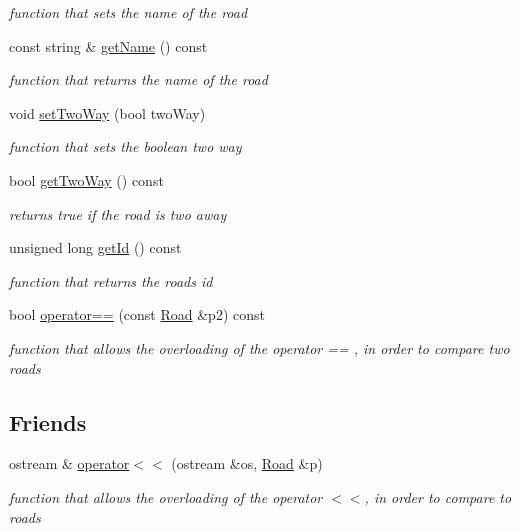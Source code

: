 \begin{DoxyCompactItemize}
\begin{DoxyCompactList}\small\item\em function that sets the name of the road \end{DoxyCompactList}\item 
const string \& \hyperlink{class_road_a55877c477adb8c1985916da16830b70e}{get\+Name} () const 
\begin{DoxyCompactList}\small\item\em function that returns the name of the road \end{DoxyCompactList}\item 
void \hyperlink{class_road_a0c749600d4e5a338643134d8f3e538b0}{set\+Two\+Way} (bool two\+Way)
\begin{DoxyCompactList}\small\item\em function that sets the boolean two way \end{DoxyCompactList}\item 
bool \hyperlink{class_road_ac984e95bef715c5c47145ac2d47177fa}{get\+Two\+Way} () const 
\begin{DoxyCompactList}\small\item\em returns true if the road is two away \end{DoxyCompactList}\item 
unsigned long \hyperlink{class_road_a2ba91475393a567e94bb6cf18d8164b8}{get\+Id} () const 
\begin{DoxyCompactList}\small\item\em function that returns the road\textquotesingle{}s id \end{DoxyCompactList}\item 
bool \hyperlink{class_road_a201ac4ee9b61b415b7144310998cff44}{operator==} (const \hyperlink{class_road}{Road} \&p2) const 
\begin{DoxyCompactList}\small\item\em function that allows the overloading of the operator == , in order to compare two roads \end{DoxyCompactList}\end{DoxyCompactItemize}
\subsection*{Friends}
\begin{DoxyCompactItemize}
\item 
ostream \& \hyperlink{class_road_abab53dff350b03ef5c3b69c9f2570247}{operator$<$$<$} (ostream \&os, \hyperlink{class_road}{Road} \&p)
\begin{DoxyCompactList}\small\item\em function that allows the overloading of the operator $<$$<$, in order to compare to roads \end{DoxyCompactList}\end{DoxyCompactItemize}


